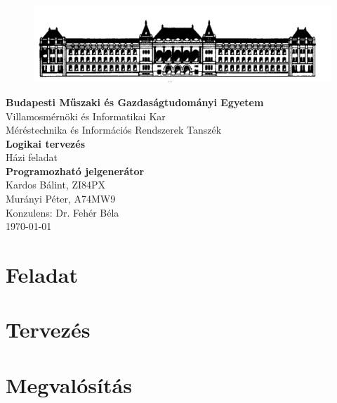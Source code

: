\documentclass[a4paper,11pt]{article}
\begin{document}
\sloppy

\begin{titlepage}
\begin{center}
\begin{figure}[t!]
	\begin{center}
	\includegraphics[scale=0.2]{bme.png}
	\label{a:bme}
	\end{center}
\end{figure}
\textbf{{Budapesti Műszaki és Gazdaságtudományi Egyetem}}\\
Villamosmérnöki és Informatikai Kar\\
Méréstechnika és Információs Rendszerek Tanszék\\
\vfill
\huge\textbf{{Logikai tervezés}}\\[3mm]
\Large{Házi feladat}\\[3mm]
\Large\textbf{{Programozható jelgenerátor}}\\
\vfill
\Large{Kardos Bálint, ZI84PX}\\
\Large{Murányi Péter, A74MW9}\\
\Large{Konzulens: Dr. Fehér Béla}\\
\vfill
\today \\

\end{center}
\end{titlepage}

\tableofcontents
\thispagestyle{empty}
\clearpage

\setcounter{page}{1}
\setcounter{tocdepth}{4}
\setcounter{secnumdepth}{4}
\setlength{\parindent}{2em}
\section{Feladat}

\section{Tervezés}

\section{Megvalósítás}
\end{document}
